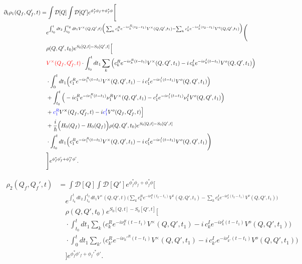 \documentclass{article}
\begin{document}
\begin{align*}
\partial_t\rho_1(Q_f, Q_f', t) &= \int \mathcal{D}[Q] \int \mathcal{D}[Q'] 
e^{\phi_f^*\phi_f+\phi_f^*\phi}\Bigg[ \\
&\quad
e^{\int_{t_0}^t dt_2 \int_{t_0}^{t_2} dt_1 V^{\times}(Q, Q', t) \Big(
\sum_k c_k^R e^{-i \nu_k^R (t_2 - t_1)} V^{\times}(Q, Q', t_1)
- \sum_k c_k^I e^{-i \nu_k^I (t_2 - t_1)} V^o(Q, Q', t_1) \Big)} \Bigg( \\
&\quad 
\rho(Q, Q', t_0)e^{S_0[Q,t]-S_0[Q',t]} \Big[\\
&\quad
\textcolor{red}{V^{\times}(Q_f, Q_f', t)}
\cdot \int_{t_0}^t dt_1 \sum_k \Big(
c_k^R e^{-i \nu_k^R (t - t_1)} V^{\times}(Q, Q', t_1)
- i \, c_k^I e^{-i \nu_k^I (t - t_1)} V^o(Q, Q', t_1)
\Big) \\
&\quad 
\cdot \int_0^t dt_1 
\Big(
c_1^R e^{-i \nu_1^R (t - t_1)} V^{\times}(Q, Q', t_1)
- i \, c_1^I e^{-i \nu_1^I (t - t_1)} V^o(Q, Q', t_1)
\Big) \\
&\quad + \int_{t_0}^t 
\Big(
- i c_1^R e^{-i \nu_1^R (t - t_1)} \nu_1^R V^{\times}(Q, Q', t_1)
- c_1^I e^{-i \nu_1^I (t - t_1)} \nu_1^I V^o(Q, Q', t_1)
\Big) \\
&\quad
+ \textcolor{blue}{c_1^R} V^{\times}(Q_f, Q_f', t) - i \textcolor{blue}{c_1^I} V^o(Q_f, Q_f', t) \Big] \\
&\quad
+ \frac{i}{\hbar} \Big(H_0(Q_f) - H_0(Q_f)\Big)\rho(Q, Q', t_0)e^{S_0[Q,t]-S_0[Q',t]} \\
&\quad 
\cdot \int_{t_0}^t dt_1 \Big(
c_1^R e^{-i \nu_1^R (t - t_1)} V^{\times}(Q, Q', t_1)
- i \, c_1^I e^{-i \nu_1^I (t - t_1)} V^o(Q, Q', t_1)\Bigg)\\
&\quad
\Bigg] e^{\phi_f^*\phi'_f+\phi_f'^*\phi'} .
\end{align*}




\begin{align*}
\rho_2(Q_f, Q_f', t) &= \int \mathcal{D}[Q] \int \mathcal{D}[Q'] 
e^{\phi_f^*\phi_f+\phi_f^*\phi}\Bigg[ \\
&\quad
e^{\int_{t_0}^t dt_2 \int_{t_0}^{t_2} dt_1 V^{\times}(Q, Q', t) \Big(
\sum_k c_k^R e^{-i \nu_k^R (t_2 - t_1)} V^x(Q, Q', t_1)
- \sum_k c_k^I e^{-i \nu_k^I (t_2 - t_1)} V^o(Q, Q', t_1) \Big)} \\
&\quad 
\rho(Q, Q', t_0)e^{S_0[Q,t]-S_0[Q',t]} \Big[\\
&\quad 
\cdot \int_{t_0}^t dt_1 \sum_k \Big(
c_k^R e^{-i \nu_k^R (t - t_1)} V^{\times}(Q, Q', t_1)
- i \, c_k^I e^{-i \nu_k^I (t - t_1)} V^o(Q, Q', t_1)
\Big) \\
&\quad 
\cdot \int_0^t dt_1 \sum_{k'} 
\Big(
c_{k'}^R e^{-i \nu_k'^R (t - t_1)} V^{\times}(Q, Q', t_1)
- i \, c_{k'}^I e^{-i \nu_{k'}^I (t - t_1)} V^o(Q, Q', t_1)
\Big) \\
&\quad 
\Bigg] e^{\phi_f^*\phi'_f+\phi_f'^*\phi'} .
\end{align*}
\end{document}
